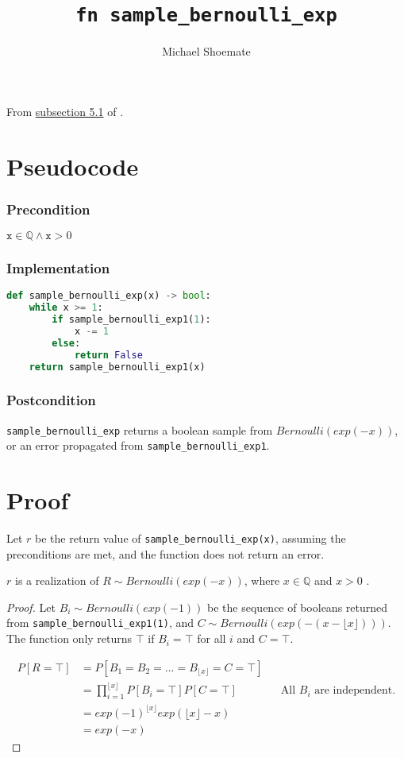 \documentclass{article}
\title{\texttt{fn sample\_bernoulli\_exp}}
\author{Michael Shoemate}
\begin{document}
\maketitle

From \href{https://arxiv.org/pdf/2004.00010.pdf#subsection.5.1}{subsection 5.1} of \cite{CKS20}.

\section{Pseudocode}
\subsubsection*{Precondition}
$\texttt{x} \in \mathbb{Q} \land \texttt{x} > 0$

\subsubsection*{Implementation}        
\begin{lstlisting}[language=Python]
def sample_bernoulli_exp(x) -> bool:
    while x >= 1:
        if sample_bernoulli_exp1(1):
            x -= 1
        else: 
            return False
    return sample_bernoulli_exp1(x)
\end{lstlisting}

\subsubsection*{Postcondition}
\texttt{sample\_bernoulli\_exp} returns a boolean sample from $Bernoulli(exp(-x))$, or an error propagated from \texttt{sample\_bernoulli\_exp1}.

\section{Proof}

Let $r$ be the return value of \texttt{sample\_bernoulli\_exp(x)}, assuming the preconditions are met, and the function does not return an error.

\begin{theorem}
$r$ is a realization of $R \sim Bernoulli(exp(-x))$, where $x \in \mathbb{Q}$ and $x > 0$ \cite{CKS20}.
\end{theorem}

\begin{proof}
Let $B_i \sim Bernoulli(exp(-1))$ be the sequence of booleans returned from \texttt{sample\_bernoulli\_exp1(1)}, and $C \sim Bernoulli(exp(-(x - \lfloor x \rfloor)))$.
The function only returns $\top$ if $B_i = \top$ for all $i$ and $C = \top$.

\begin{align*}
    P[R = \top] &= P[B_1 = B_2 = ... = B_{\lfloor x \rfloor} = C = \top] \\
    &= \prod_{i=1}^{\lfloor x \rfloor} P[B_i = \top] P[C = \top] && \text{All $B_i$ are independent.} \\
    &= exp(-1)^{\lfloor x \rfloor} exp(\lfloor x \rfloor - x) \\
    &= exp(-x)
\end{align*}
\end{proof}



\end{document}
